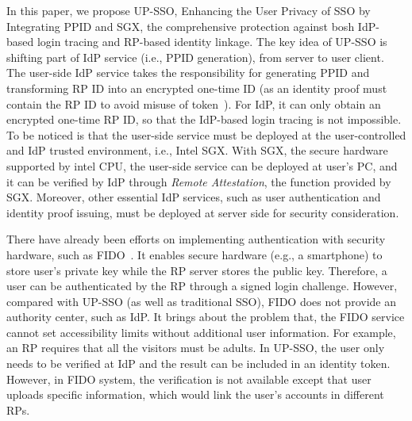 In this paper, we propose UP-SSO, Enhancing the User Privacy of SSO by Integrating PPID and SGX, the comprehensive protection against bosh IdP-based login tracing and RP-based identity linkage.
The key idea of UP-SSO is shifting part of IdP service (i.e., PPID generation), from server to user client. 
The user-side IdP service takes the responsibility for generating PPID and transforming RP ID into an encrypted one-time ID (as an identity proof must contain the RP ID to avoid misuse of token~\cite{YangLCZ18, WangZLG16, MainkaMS16, MainkaMSW17}). 
For IdP, it can only obtain an encrypted one-time RP ID, so that the IdP-based login tracing is not impossible.
To be noticed is that the user-side service must be deployed at the user-controlled and IdP trusted environment, i.e., Intel SGX. With SGX, the secure hardware supported by intel CPU, the user-side service can be deployed at user's PC, and it can be verified by IdP through \emph{Remote Attestation}, the function provided by SGX.
Moreover, other essential IdP services, such as user authentication and identity proof issuing,  must be deployed at server side for security consideration. 


There have already been efforts on implementing authentication with security hardware, such as FIDO~\cite{fidouaf,fidou2f}. It enables secure hardware (e.g., a smartphone) to store user's private key while the RP server stores the public key. Therefore, a user can be authenticated by the RP through a signed login challenge. However, compared with UP-SSO (as well as traditional SSO), FIDO does not provide an authority center, such as IdP. It brings about the problem that, the FIDO service cannot set accessibility limits without additional user information. For example, an RP requires that all the visitors must be adults. 
In UP-SSO, the user only needs to be verified at IdP and the result can be included in an identity token. However, in FIDO system, the verification is not available except that user uploads specific information, which would link the user's accounts in different RPs. 

